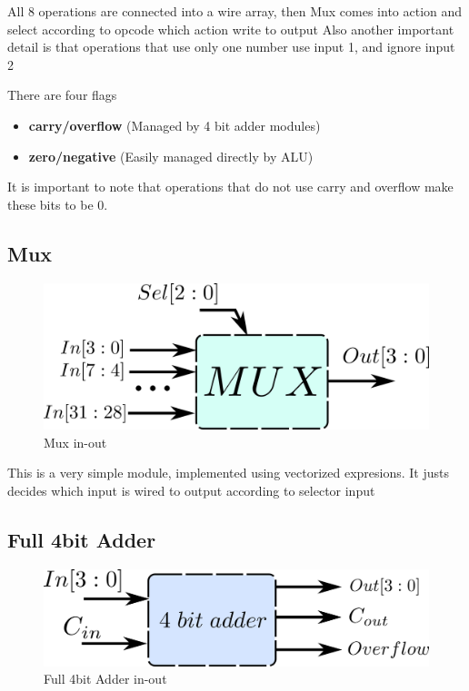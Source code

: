 All 8 operations are connected into a wire array, then Mux comes into action and select according to opcode which action write to output
Also another important detail is that operations that use only one number use input 1, and ignore input 2

There are four flags
\begin{itemize}
  \item \textbf{carry/overflow} (Managed by 4 bit adder modules)
  \item \textbf{zero/negative} (Easily managed directly by ALU)
\end{itemize}
It is important to note that operations that do not use carry and overflow make these bits to be 0.

\subsection*{Mux}
\begin{figure}[H]
  \begin{centering}
  \includegraphics[scale=1]{data/mux.png}
  \par\end{centering}
  \caption{Mux in-out}
\end{figure}

This is a very simple module, implemented using vectorized expresions. It justs decides which input is wired to output according to selector input

\subsection*{Full 4bit Adder}

\begin{figure}[H]
  \begin{centering}
  \includegraphics[scale=1]{data/4bitadder.png}
  \par\end{centering}
  \caption{Full 4bit Adder in-out}
\end{figure}

